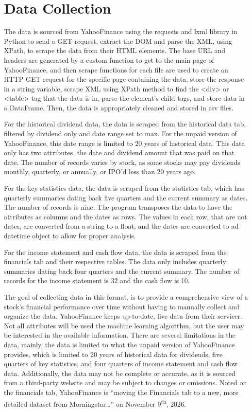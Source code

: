 \documentclass[runningheads]{llncs}
\begin{document}
\section{Data Collection}

The data is sourced from YahooFinance\cite{YahooFinance} using the requests and lxml library in Python to send a GET request, extract the DOM and parse the XML, using XPath, to scrape the data from their HTML elements. The base URL and headers are generated by a custom function to get to the main page of YahooFinance, and then scrape functions for each file are used to create an HTTP GET request for the specific page containing the data, store the response in a string variable, scrape XML using XPath method to find the <div> or <table> tag that the data is in, parse the element's child tags, and store data in a DataFrame. Then, the data is appropriately cleaned and stored in csv files.

For the historical dividend data, the data is scraped from the historical data tab, filtered by dividend only and date range set to max. For the unpaid version of YahooFinance, this date range is limited to 20 years of historical data. This data only has two attributes, the date and dividend amount that was paid on that date. The number of records varies by stock, as some stocks may pay dividends monthly, quarterly, or annually, or IPO'd less than 20 years ago.

For the key statistics data, the data is scraped from the statistics tab, which has quarterly summaries dating back five quarters and the current summary as dates. The number of records is nine. The program transposes the data to have the attributes as columns and the dates as rows. The values in each row, that are not dates, are converted from a string to a float, and the dates are converted to ad datetime object to allow for proper analysis.

For the income statement and cash flow data, the data is scraped from the financials tab and their respective tables. The data only includes quarterly summaries dating back four quarters and the current summary. The number of records for the income statement is 32 and the cash flow is 10.

The goal of collecting data in this format, is to provide a comprehensive view of a stock's financial performance over time without having to manually collect and organize the data. YahooFinance keeps up-to-date, live data from their servicer. Not all attributes will be used the machine learning algorithm, but the user may be interested in the available information. There are several limitations in the data, mainly, the data is limited to what the unpaid version of YahooFinance provides, which is limited to 20 years of historical data for dividends, five quarters of key statistics, and four quarters of income statement and cash flow data. Additionally, the data may not be complete or accurate, as it is sourced from a third-party website and may be subject to changes or omissions. Noted on the financials tab, YahooFinance is ``moving the Financials tab to a new, more detailed dataset from Morningstar\ldots''\cite{YahooFinanceHelp} on November 9\textsuperscript{th}, 2026.
\end{document}
